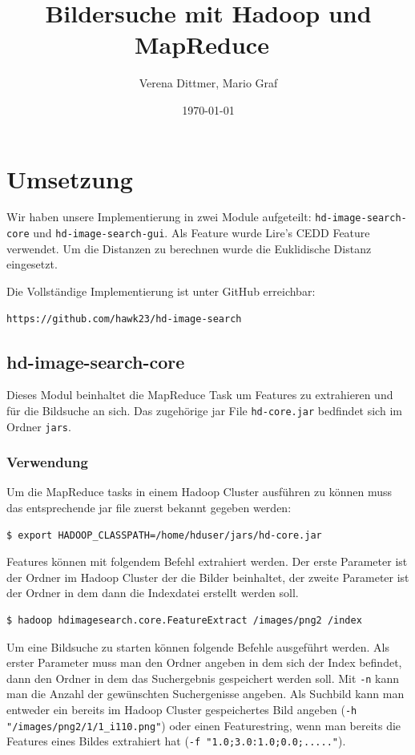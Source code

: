 \documentclass[paper=a4, fontsize=11pt]{scrartcl} %
\title{	
\normalfont \normalsize 
\huge Bildersuche mit Hadoop und MapReduce\ %
\horrule{0.2pt} %
}
\author{Verena Dittmer, Mario Graf} %
\date{\normalsize\today} %
\numberwithin{equation}{section} %
\numberwithin{figure}{section} %
\numberwithin{table}{section} %
\begin{document}
\maketitle %
\lstset{style=base}

\section{Umsetzung}

Wir haben unsere Implementierung in zwei Module aufgeteilt: \lstinline$hd-image-search-core$ und \lstinline$hd-image-search-gui$. Als Feature wurde Lire's CEDD Feature verwendet. Um die Distanzen zu berechnen wurde die Euklidische Distanz eingesetzt.

Die Vollständige Implementierung ist unter GitHub erreichbar:
\begin{lstlisting}
https://github.com/hawk23/hd-image-search
\end{lstlisting}

\subsection{hd-image-search-core}
Dieses Modul beinhaltet die MapReduce Task um Features zu extrahieren und für die Bildsuche an sich. Das zugehörige jar File \lstinline$hd-core.jar$ bedfindet sich im Ordner \lstinline$jars$.

\subsubsection{Verwendung}\label{chapterVerwendung}
Um die MapReduce tasks in einem Hadoop Cluster ausführen zu können muss das entsprechende jar file zuerst bekannt gegeben werden:
\begin{lstlisting}
$ export HADOOP_CLASSPATH=/home/hduser/jars/hd-core.jar
\end{lstlisting}

Features können mit folgendem Befehl extrahiert werden. Der erste Parameter ist der Ordner im Hadoop Cluster der die Bilder beinhaltet, der zweite Parameter ist der Ordner in dem dann die Indexdatei erstellt werden soll.
\begin{lstlisting}
$ hadoop hdimagesearch.core.FeatureExtract /images/png2 /index
\end{lstlisting}

Um eine Bildsuche zu starten können folgende Befehle ausgeführt werden. Als erster Parameter muss man den Ordner angeben in dem sich der Index befindet, dann den Ordner in dem das Suchergebnis gespeichert werden soll. Mit \lstinline$-n$ kann man die Anzahl der gewünschten Suchergenisse angeben. Als Suchbild kann man entweder ein bereits im Hadoop Cluster gespeichertes Bild angeben (\lstinline$-h "/images/png2/1/1_i110.png"$) oder einen Featurestring, wenn man bereits die Features eines Bildes extrahiert hat (\lstinline$-f "1.0;3.0:1.0;0.0;....."$).
\end{document}
